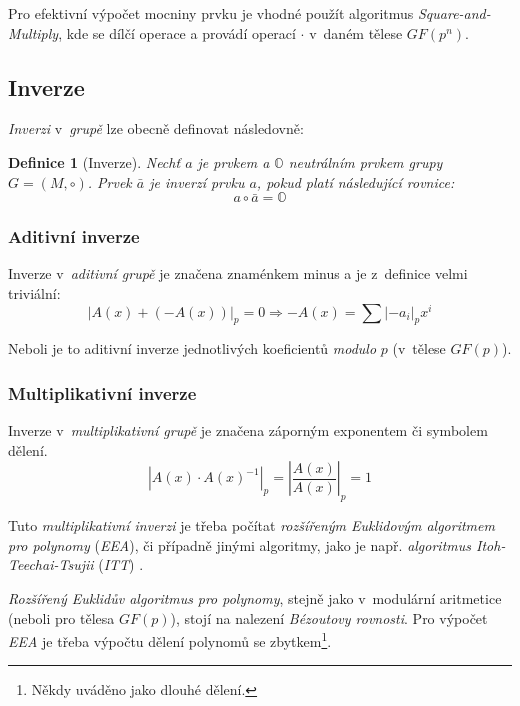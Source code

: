 \documentclass[thesis=M,czech,hidelinks]{FITthesis}[2012/06/26]
\newcommand{\0}{{\textcolor[gray]{0.80}{0}}}
\newtheorem{definice}{Definice}
\begin{document}
Pro efektivní výpočet mocniny prvku je vhodné použít algoritmus
\emph{Square-and-Multiply}, kde se dílčí operace  a 
provádí operací $\cdot$ v~daném tělese $GF(p^n)$.

\subsection{Inverze}
\emph{Inverzi} v~\emph{grupě} lze obecně definovat následovně:
\begin{definice}[Inverze]
    Nechť $a$ je prvkem a $\mathbb{O}$ neutrálním prvkem \emph{grupy} \\
    $G = (M,\circ)$. Prvek $\bar{a}$ je \emph{inverzí} prvku $a$, pokud
    platí následující rovnice:
    $$ a \circ \bar{a} = \mathbb{O} $$
\end{definice}

\subsubsection{Aditivní inverze}
Inverze v~\emph{aditivní grupě} je značena znaménkem minus \uv{$-$} a je
z~definice velmi triviální:
$$ \left| A(x) + (-A(x)) \right|_p = 0 \Rightarrow
-A(x) = \sum \left|-a_i\right|_p x^i $$

Neboli je to aditivní inverze jednotlivých koeficientů \emph{modulo} $p$
(v~tělese $GF(p)$).


\subsubsection{Multiplikativní inverze}
Inverze v~\emph{multiplikativní grupě} je značena záporným exponentem
 či symbolem dělení.
$$ \left| A(x) \cdot A(x)^{-1} \right|_p =
\left| \frac{A(x)}{A(x)} \right|_p = 1 $$

Tuto \emph{multiplikativní inverzi} je třeba počítat \emph{rozšířeným Euklidovým
algoritmem pro polynomy} (\emph{EEA}), či případně jinými algoritmy, jako je
např. \emph{algoritmus Itoh-Teechai-Tsujii} (\emph{ITT}) \cite{FIT_BHW,ITT}.

\emph{Rozšířený Euklidův algoritmus} \emph{pro polynomy}, stejně jako
v~modulární aritmetice (neboli pro tělesa $GF(p)$), stojí na nalezení
\emph{Bézoutovy rovnosti}. Pro výpočet \emph{EEA} je třeba výpočtu dělení
polynomů se zbytkem\footnote{
    Někdy uváděno jako dlouhé dělení.
}.

\end{document}
